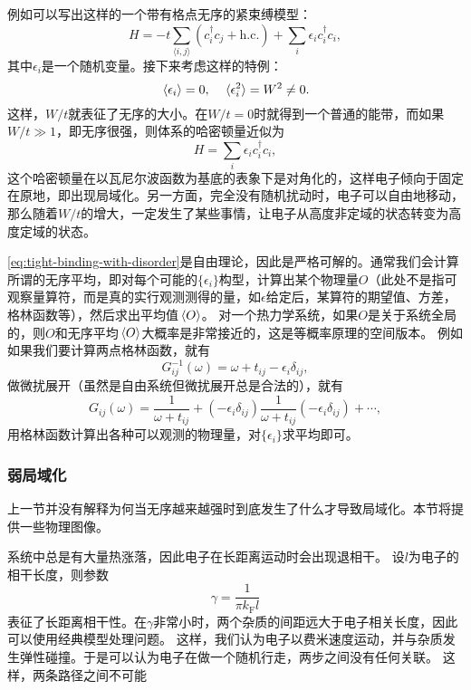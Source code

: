 \documentclass[hyperref, UTF8, a4paper]{ctexart}
\newcommand*{\pair}[1]{\langle #1 \rangle}
\begin{document}
例如可以写出这样的一个带有格点无序的紧束缚模型：
\begin{equation}
    {H} = - t \sum_{\pair{i, j}} ({c}_i^\dagger {c}_j + \text{h.c.}) + \sum_i \epsilon_i {c}_i^\dagger {c}_i,
    \label{eq:tight-binding-with-disorder}
\end{equation}
其中$\epsilon_i$是一个随机变量。接下来考虑这样的特例：
\begin{equation}
    \expval*{\epsilon_i} = 0, \quad \expval*{\epsilon_i^2} = W^2 \neq 0.
\end{equation}
这样，$W/t$就表征了无序的大小。在$W/t=0$时就得到一个普通的能带，而如果$W/t \gg 1$，即无序很强，则体系的哈密顿量近似为
\[
    {H} = \sum_i \epsilon_i {c}_i^\dagger {c}_i,
\]
这个哈密顿量在以瓦尼尔波函数为基底的表象下是对角化的，这样电子倾向于固定在原地，即出现局域化。另一方面，完全没有随机扰动时，电子可以自由地移动，那么随着$W/t$的增大，一定发生了某些事情，让电子从高度非定域的状态转变为高度定域的状态。

\eqref{eq:tight-binding-with-disorder}是自由理论，因此是严格可解的。通常我们会计算所谓的无序平均，即对每个可能的$\{\epsilon_i\}$构型，计算出某个物理量$O$（此处不是指可观察量算符，而是真的实行观测测得的量，如$\epsilon$给定后，某算符的期望值、方差，格林函数等），然后求出平均值$\expval*{O}$。
对一个热力学系统，如果$O$是关于系统全局的，则$O$和无序平均$\expval*{O}$大概率是非常接近的，这是等概率原理的空间版本。
例如如果我们要计算两点格林函数，就有
\[
    G^{-1}_{ij}(\omega) = \omega + t_{ij} - \epsilon_i \delta_{ij},
\]
做微扰展开（虽然是自由系统但微扰展开总是合法的），就有
\[
    G_{ij}(\omega) = \frac{1}{\omega + t_{ij}} + (- \epsilon_i \delta_{ij}) \frac{1}{\omega + t_{ij}} (- \epsilon_i \delta_{ij}) + \cdots,
\]
用格林函数计算出各种可以观测的物理量，对$\{\epsilon_i\}$求平均即可。

\subsubsection{弱局域化}

上一节并没有解释为何当无序越来越强时到底发生了什么才导致局域化。本节将提供一些物理图像。

系统中总是有大量热涨落，因此电子在长距离运动时会出现退相干。
设$l$为电子的相干长度，则参数
\begin{equation}
    \gamma = \frac{1}{\pi k_\text{F} l}
\end{equation}
表征了长距离相干性。在$\gamma$非常小时，两个杂质的间距远大于电子相关长度，因此可以使用经典模型处理问题。
这样，我们认为电子以费米速度运动，并与杂质发生弹性碰撞。于是可以认为电子在做一个随机行走，两步之间没有任何关联。
这样，两条路径之间不可能
\end{document}
